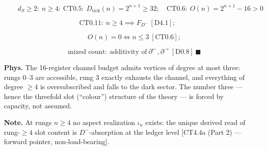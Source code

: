 \begin{corollary}
\[
\qquad d_S\ge2:\ n\ge4:\ \mathrm{CT0.5}:\ D_{\mathrm{tick}}(n)=2^{n+1}\ge32;\quad\mathrm{CT0.6}:\ O(n)=2^{n+1}-16>0
\]

\[
\mathrm{CT0.11}:\ n\ge4\implies F_{D^-}\ [\mathrm{D4.1}];
\]

\[
\qquad O(n)=0\iff n\le3\ [\mathrm{CT0.6}];
\]

\[
\qquad \text{mixed count}:\ \text{additivity of}\ \partial^{\leftarrow},\partial^{\rightarrow}\ [\mathrm{D0.8}]\ \blacksquare
\]

\textbf{Phys.} The 16-register channel budget admits vertices of degree at most three: rungs $0$–$3$ are accessible, rung $3$ exactly exhausts the channel, and everything of degree $\ge4$ is oversubscribed and falls to the dark sector. The number three — hence the threefold slot (“colour”) structure of the theory — is forced by capacity, not assumed.

\textbf{Note.} At rungs $n\ge4$ no aspect realization $\iota_n$ exists: the unique derived read of rung-$\ge4$ slot content is $D^-$-absorption at the ledger level [CT4.4a (Part 2) — forward pointer, non-load-bearing].

\end{corollary}

